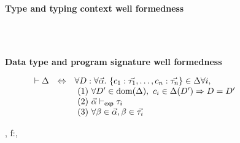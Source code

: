 \documentclass[acmsmall,screen,nonacm]{acmart}
\newcommand{\hdr}[2]{%
\flushleft
\textbf{#1} \hfill {#2} \\
\centering
}
\theoremstyle{definition}
\begin{document}
\begin{figure}[t]
  \hdr{Type and typing context well formedness}{
    \quad \fbox{$\implicit{\Delta} \vdash \Gamma$}
    \quad \fbox{$\implicit{\Delta; {}} \Gamma \vdash_m \tau$}
  }

  \threesidebyside
  {
  }
  {
  }
  {
  }

  ~ \\[0.5em]

  {
  \infrule[$t$-TVar]{\alpha \in \Gamma}{\Gamma \vdash_\mEXP \alpha}
  }
  {
  }

  \threesidebyside
  {
  }
  {
  }
  {
  }

  ~ \\[0.5em]

  \hdr{Data type and program signature well formedness}{
    \quad \fbox{$\vdash \Delta$}
    \quad \fbox{$\vdash \Phi$}
  }

  \[ \begin{array}{rcl}
    \vdash \Delta &\Leftrightarrow& \forall D:\forall \vec{\alpha}. ~ \{ c_1 : \vec{\tau_1}, \dots, c_n : \vec{\tau_n} \} \in \Delta \forall i, \\
    && \text{  (1) } \forall D' \in \mathrm{dom}(\Delta), ~ c_i \in \Delta(D') \Rightarrow D = D' \\
    && \text{  (2) } \vec{\alpha} \vdash_{\mathsf{exp}} \tau_i \\
    && \text{  (3) } \forall \beta \in \vec{\alpha}, \beta \in \vec{\tau_i}
  \end{array}
  \]

  {
     {\vdash \Phi, f:\forall {},  \rightarrow \tau}}
  

\end{figure}
\end{document}
